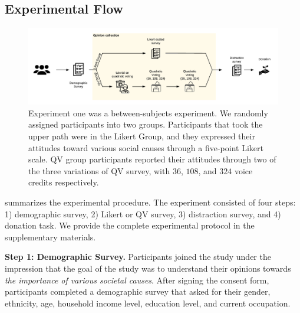 \subsection{Experimental Flow}
\begin{figure}[htpb]
    \centering
    \includegraphics[width=\textwidth, keepaspectratio=true]{content/image/exp1_flow.pdf}
    \caption{
        Experiment one was a between-subjects experiment. We randomly assigned participants into two groups. Participants that took the upper path were in the Likert Group, and they expressed their attitudes toward various social causes through a five-point Likert scale. QV group participants reported their attitudes through two of the three variations of QV survey, with $36$, $108$, and $324$ voice credits respectively.
    }
    \label{fig:exp1_image_flow}
\end{figure}

 summarizes the experimental procedure. The experiment consisted of four steps: 1) demographic survey, 2) Likert or QV survey, 3) distraction survey, and 4) donation task. We provide the complete experimental protocol in the supplementary materials.



\textbf{Step 1: Demographic Survey.} Participants joined the study under the impression that the goal of the study was to understand their opinions towards \textit{the importance of various societal causes}. After signing the consent form, participants completed a demographic survey that asked for their gender, ethnicity, age, household income level, education level, and current occupation.

